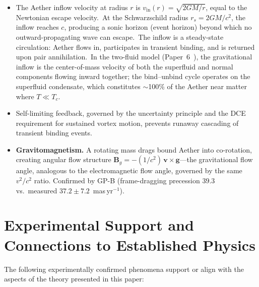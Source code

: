 ﻿\documentclass[12pt,letterpaper]{article}
\newcommand{\vin}{v_{\mathrm{in}}}
\newcommand{\rs}{r_s}
\begin{document}
\begin{itemize}[leftmargin=2em]
  \item The Aether inflow velocity at radius $r$ is $\vin(r) = \sqrt{2GM/r}$, equal to the
    Newtonian escape velocity.\ At the Schwarzschild radius $\rs = 2GM/c^2$, the inflow
    reaches $c$, producing a sonic horizon (event horizon) beyond which no
    outward-propagating wave can escape.\ The inflow is a steady-state
    circulation: Aether flows in, participates in transient binding, and is
    returned upon pair annihilation.\ In the two-fluid model
    (Paper~6~\cite{otto-cosmology}), the gravitational inflow is the
    center-of-mass velocity of both the superfluid and normal components
    flowing inward together; the bind--unbind cycle operates on the
    superfluid condensate, which constitutes $\sim$100\% of the Aether near
    matter where $T \ll T_c$.
  \item Self-limiting feedback, governed by the uncertainty principle and the DCE requirement
    for sustained vortex motion, prevents runaway cascading of transient binding events.
  \item \textbf{Gravitomagnetism.}
    A rotating mass drags bound Aether into co-rotation, creating angular
    flow structure $\mathbf{B}_g = -(1/c^2)\,\mathbf{v}\times\mathbf{g}$---the
    gravitational flow angle, analogous to the electromagnetic flow angle, governed
    by the same $v^2/c^2$ ratio.  Confirmed by GP-B (frame-dragging precession
    $39.3$ vs.\ measured $37.2 \pm 7.2$~mas\,yr$^{-1}$).
\end{itemize}



\section{Experimental Support and Connections to Established Physics}

The following experimentally confirmed phenomena support or align with the aspects of the theory presented in this paper:
\end{document}
